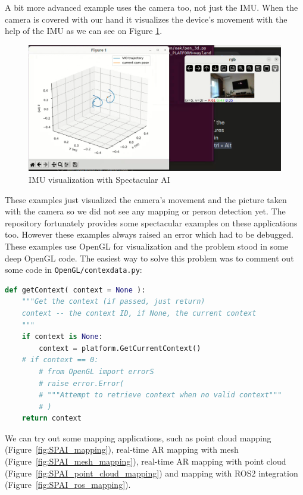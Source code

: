 A bit more advanced example uses the camera too, not just the IMU. When the camera is covered with our hand it visualizes the device's movement with the help of the IMU as we can see on Figure \ref{fig:3d_pen}.

\begin{figure}[htbp]
	\centering
	\includegraphics[width=150mm, keepaspectratio]{figures/3d_pen.png}
	\caption{IMU visualization with Spectacular AI}
	\label{fig:3d_pen}
\end{figure}

These examples just visualized the camera's movement and the picture taken with the camera so we did not see any mapping or person detection yet. The repository fortunately provides some spectacular examples on these applications too. However these examples always raised an error which had to be debugged. These examples use OpenGL for visualization and the problem stood in some deep OpenGL code. The easiest way to solve this problem was to comment out some code in \verb|OpenGL/contexdata.py|:

\begin{lstlisting}[language=python,frame=single,float=!ht]
def getContext( context = None ):
    """Get the context (if passed, just return)
    context -- the context ID, if None, the current context
    """
    if context is None:
        context = platform.GetCurrentContext()
    # if context == 0:
        # from OpenGL import errorS
        # raise error.Error(
        # """Attempt to retrieve context when no valid context"""
        # )
    return context
\end{lstlisting}
\FloatBarrier

We can try out some mapping applications, such as point cloud mapping (Figure~\ref{fig:SPAI_mapping}), real-time AR mapping with mesh (Figure~\ref{fig:SPAI_mesh_mapping}), real-time AR mapping with point cloud (Figure~\ref{fig:SPAI_point_cloud_mapping}) and mapping with ROS2 integration (Figure~\ref{fig:SPAI_ros_mapping}).

